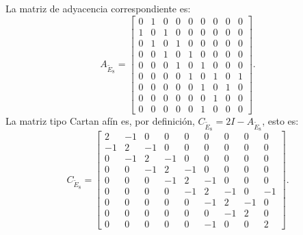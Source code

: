 \documentclass[11pt,a4paper]{article}
\theoremstyle{definition}
\theoremstyle{remark}
\begin{document}
\begin{center}
\end{center}

La matriz de adyacencia correspondiente es:
\[
A_{\widetilde{E}_8}=
\begin{bmatrix}
0 & 1 & 0 & 0 & 0 & 0 & 0 & 0 & 0 \\
1 & 0 & 1 & 0 & 0 & 0 & 0 & 0 & 0 \\
0 & 1 & 0 & 1 & 0 & 0 & 0 & 0 & 0 \\
0 & 0 & 1 & 0 & 1 & 0 & 0 & 0 & 0 \\
0 & 0 & 0 & 1 & 0 & 1 & 0 & 0 & 0 \\
0 & 0 & 0 & 0 & 1 & 0 & 1 & 0 & 1 \\
0 & 0 & 0 & 0 & 0 & 1 & 0 & 1 & 0 \\
0 & 0 & 0 & 0 & 0 & 0 & 1 & 0 & 0 \\
0 & 0 & 0 & 0 & 0 & 1 & 0 & 0 & 0
\end{bmatrix}.
\]
La matriz tipo Cartan afín es, por definición, $C_{\widetilde{E}_8}=2I-A_{\widetilde{E}_8}$, esto es:
\[
C_{\widetilde{E}_8}=
\begin{bmatrix}
2 & -1 & 0 & 0 & 0 & 0 & 0 & 0 & 0 \\
-1 & 2 & -1 & 0 & 0 & 0 & 0 & 0 & 0 \\
0 & -1 & 2 & -1 & 0 & 0 & 0 & 0 & 0 \\
0 & 0 & -1 & 2 & -1 & 0 & 0 & 0 & 0 \\
0 & 0 & 0 & -1 & 2 & -1 & 0 & 0 & 0 \\
0 & 0 & 0 & 0 & -1 & 2 & -1 & 0 & -1 \\
0 & 0 & 0 & 0 & 0 & -1 & 2 & -1 & 0 \\
0 & 0 & 0 & 0 & 0 & 0 & -1 & 2 & 0 \\
0 & 0 & 0 & 0 & 0 & -1 & 0 & 0 & 2
\end{bmatrix}.
\]
\end{document}
